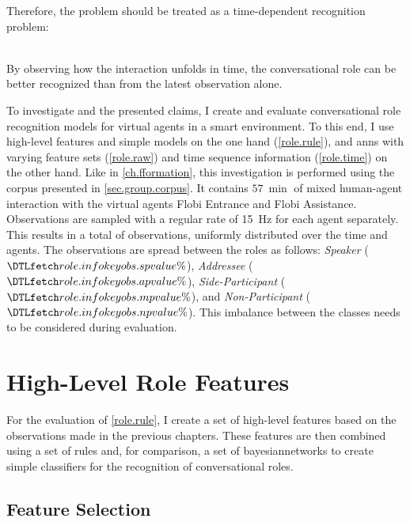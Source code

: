Therefore, the problem should be treated as a time-dependent recognition problem:
\newcommand{\hyproletime}{By observing how the interaction unfolds in time, the \gls{conversational role} can be better recognized than from the latest observation alone.}
\begin{hyp3}
    \label{role.time}
    \hspace{0pt}\\
    \hyproletime
\end{hyp3}
To investigate  and the presented claims, I create and evaluate \gls{conversational role} recognition models for \glspl{virtual agent} in a \gls{smart environment}.
To this end, I use high-level features and simple models on the one hand (\cref{role.rule}), and \glspl{ann} with varying feature sets (\cref{role.raw}) and time sequence information (\cref{role.time}) on the other hand.
Like in \cref{ch.fformation}, this investigation is performed using the corpus presented in \cref{sec.group.corpus}.
It contains \(\SI{57}{\min}\) of mixed human-agent interaction with the \glspl{virtual agent} \gls{Flobi Entrance} and \gls{Flobi Assistance}.
Observations are sampled with a regular rate of \SI{15}{\Hz} for each agent separately.
This results in a total of  observations, uniformly distributed over the time and agents.
The observations are spread between the roles as follows: \emph{Speaker} (\(\inidata{role.info}{obs.sp}\%\)), \emph{Addressee} (\(\inidata{role.info}{obs.ap}\%\)), \emph{Side-Participant} (\(\inidata{role.info}{obs.mp}\%\)), and \emph{Non-Participant} (\(\inidata{role.info}{obs.np}\%\)).
This imbalance between the classes needs to be considered during evaluation.

\section{High-Level Role Features}

For the evaluation of \cref{role.rule}, I create a set of high-level features based on the observations made in the previous chapters.
These features are then combined using a set of rules and, for com\-pa\-ri\-son, a set of \glspl{bayesiannetwork} to create simple classifiers for the recognition of \glspl{conversational role}.

\subsection{Feature Selection}\label{sec:role-rule-features}

